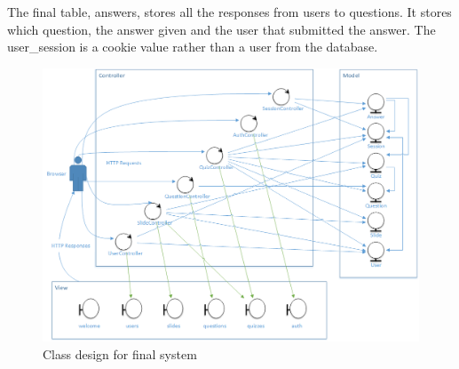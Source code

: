The final table, answers, stores all the responses from users to questions. It stores which question, the answer given and the user that submitted the answer. The user\_session is a cookie value rather than a user from the database.

\begin{figure}
	\caption{Class design for final system}
	\centerline{\includegraphics{Chapter3/overall-class-design}}
	\label{fig:overall-class-design}
\end{figure}
